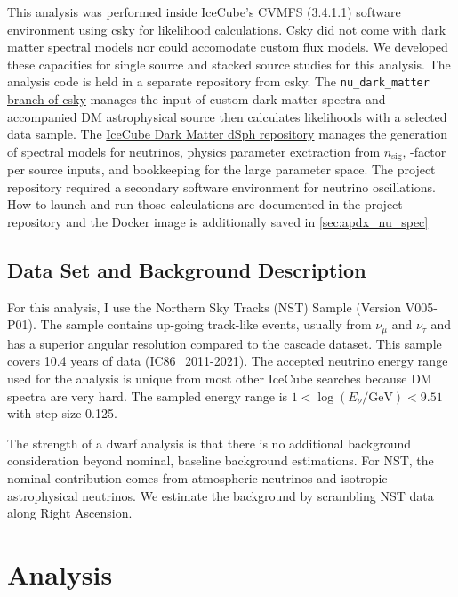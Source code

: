 This analysis was performed inside IceCube's CVMFS (3.4.1.1) software environment using csky for likelihood calculations.
Csky did not come with dark matter spectral models nor could accomodate custom flux models.
We developed these capacities for single source and stacked source studies for this analysis.
The analysis code is held in a separate repository from csky.
The \texttt{nu\_dark\_matter} \href{https://github.com/icecube/csky/tree/nu\_dark\_matter}{branch of csky} manages the input of custom dark matter spectra and accompanied DM astrophysical source then calculates likelihoods with a selected data sample.
The \href{https://github.com/salaza82/IceCube_dark_matter_dsph}{IceCube Dark Matter dSph repository} manages the generation of spectral models for neutrinos, physics parameter exctraction from $n_{\mathrm{sig}}$, \J-factor per source inputs, and bookkeeping for the large parameter space.
The project repository required a secondary software environment for neutrino oscillations.
How to launch and run those calculations are documented in the project repository and the Docker image is additionally saved in \cref{sec:apdx_nu_spec}

\subsection{Data Set and Background Description} \label{sec:icDM_data_bkgd}

For this analysis, I use the Northern Sky Tracks (NST) Sample (Version V005-P01).
The sample contains up-going track-like events, usually from $\nu_\mu$ and $\nu_\tau$ and has a superior angular resolution compared to the cascade dataset.
This sample covers 10.4 years of data (IC86\_2011-2021).
The accepted neutrino energy range used for the analysis is unique from most other IceCube searches because DM spectra are very hard.
The sampled energy range is $1 < \log(E_\nu /\textrm{GeV}) < 9.51$ with step size 0.125.

The strength of a dwarf analysis is that there is no additional background consideration beyond nominal, baseline background estimations.
For NST, the nominal contribution comes from atmospheric neutrinos and isotropic astrophysical neutrinos.
We estimate the background by scrambling NST data along Right Ascension.

\section{Analysis}\label{sec:icDM_analysis}

